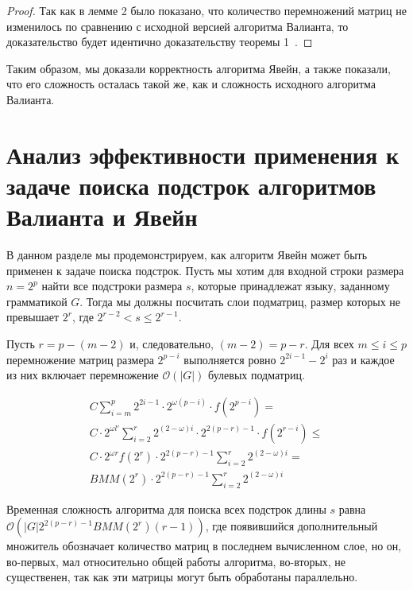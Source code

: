 \begin{proof}
Так как в лемме 2 было показано, что количество перемножений матриц не изменилось по сравнению с исходной версией алгоритма Валианта, то доказательство будет идентично доказательству теоремы 1~\cite{Okhotin:2014:PMM:2565359.2565379}.
\end{proof}

Таким образом, мы доказали корректность алгоритма Явейн, а также показали, что его сложность осталась такой же, как и сложность исходного алгоритма Валианта.


\section{Анализ эффективности применения к задаче поиска подстрок алгоритмов Валианта и Явейн}

В данном разделе мы продемонстрируем, как алгоритм Явейн может быть применен к задаче поиска подстрок.
Пусть мы хотим для входной строки размера $n = 2^p$ найти все подстроки размера $s$, которые принадлежат языку, заданному грамматикой $G$.
Тогда мы должны посчитать слои подматриц, размер которых не превышает $2^{r}$, где $2^{r - 2} < s \le 2^{r - 1}$.

Пусть $r = p - (m - 2)$ и, следовательно, $(m - 2) = p - r$.
Для всех  $m \le i \le p$ перемножение матриц размера $2^{p - i}$ выполняется ровно $2^{2i - 1} - 2^{i}$ раз и каждое из них включает перемножение $\mathcal{O}(|G|)$ булевых подматриц.

\begin{equation*}
\begin{array}{c}
C \sum\limits_{i=m}^p 2^{2i - 1} \cdot 2^{\omega(p - i)} \cdot f(2^{p - i}) = \\
C \cdot 2^{\omega l'}\sum\limits_{i=2}^{r} 2^{(2 - \omega)i} \cdot 2^{2(p - r) - 1} \cdot f(2^{r - i}) \le \\
C \cdot 2^{\omega r} f(2^{r}) \cdot 2^{2(p - r) - 1} \sum\limits_{i=2}^{r} 2^{(2 - \omega)i} = \\
BMM(2^{r}) \cdot 2^{2(p - r) - 1} \sum\limits_{i=2}^{r} 2^{(2 - \omega)i}
\end{array}
\end{equation*}

Временная сложность алгоритма для поиска всех подстрок длины $s$ равна $\mathcal{O}(|G|2^{2(p - r) - 1}BMM(2^{r})(r - 1))$, где появившийся дополнительный множитель обозначает количество матриц в последнем вычисленном слое, но он, во-первых, мал относительно общей работы алгоритма, во-вторых, не существенен, так как эти матрицы могут быть обработаны параллельно.

